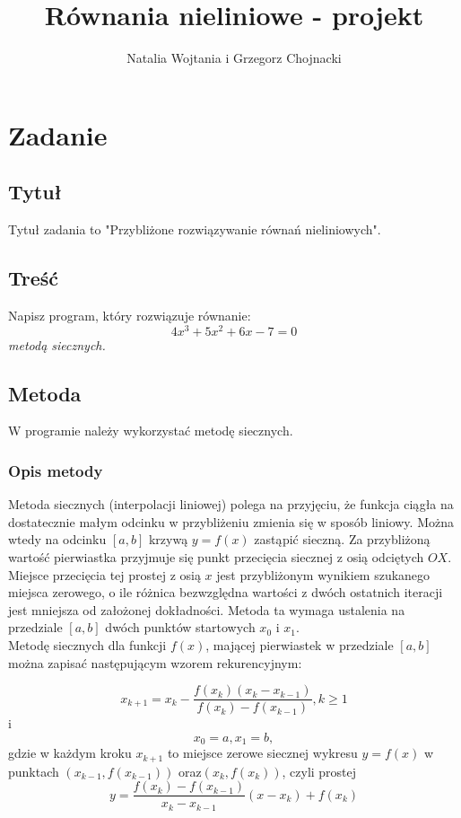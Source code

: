 \documentclass[12pt]{article}
\title{Równania nieliniowe - projekt}
\author{Natalia Wojtania i Grzegorz Chojnacki}
\begin{document}
\maketitle

\section{Zadanie}
\subsection{Tytuł}
Tytuł zadania to "Przybliżone rozwiązywanie równań nieliniowych".
\subsection{Treść}
Napisz program, który rozwiązuje równanie: $$4x^{3} + 5x^{2} + 6x - 7 = 0$$\emph{metodą siecznych.} 
\subsection{Metoda}
W programie należy wykorzystać metodę siecznych.
\subsubsection{Opis metody}
 
Metoda siecznych (interpolacji liniowej) polega na przyjęciu, że funkcja ciągła na dostatecznie małym odcinku w przybliżeniu zmienia się w sposób liniowy. Można wtedy na odcinku $[a,b]$ krzywą $y=f(x)$ zastąpić sieczną. Za przybliżoną wartość pierwiastka przyjmuje się punkt przecięcia siecznej z osią odciętych $OX$. Miejsce przecięcia tej prostej z osią $x$ jest przybliżonym wynikiem szukanego miejsca zerowego, o ile różnica bezwzględna wartości z dwóch ostatnich iteracji jest mniejsza od założonej dokładności.  Metoda ta wymaga ustalenia na przedziale $[a,b]$ dwóch punktów startowych $x_0$ i $x_1$.\\
Metodę siecznych dla funkcji $f(x)$, mającej pierwiastek w przedziale $[ a , b ]$ można zapisać następującym wzorem rekurencyjnym:

 $$x_{k+1}=x_k - \frac{f(x_k)(x_k-x_{k-1})}{f(x_k)-f(x_{k-1})}, k \geq 1$$ i $$x_0=a, x_1=b, $$ gdzie w każdym kroku $ x_{k+1}$ to miejsce zerowe siecznej wykresu $y=f(x)$ w punktach $(x_{k-1},f(x_{k-1}))$ oraz$ (x_{k},f(x_{k})) $, czyli prostej $$y=\frac{f(x_k)-f(x_{k-1})}{x_k-x_{k-1}}(x-x_k)+f(x_k)$$
\end{document}
